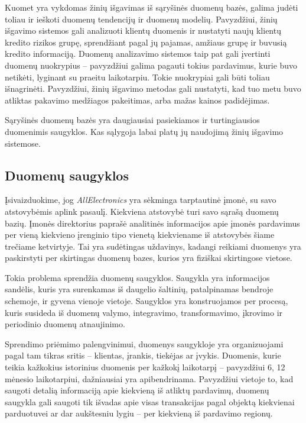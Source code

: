 Kuomet yra vykdomas žinių išgavimas iš sąryšinės duomenų bazės, galima judėti toliau ir ieškoti duomenų tendencijų ir duomenų modelių.
Pavyzdžiui, žinių išgavimo sistemos gali analizuoti klientų duomenis ir nustatyti naujų klientų kredito rizikos grupę, sprendžiant pagal jų pajamas, amžiaus grupę ir buvusią kredito informaciją.
Duomenų analizavimo sistemos taip pat gali įvertinti duomenų nuokrypius -- pavyzdžiui galima pagauti tokius pardavimus, kurie buvo netikėti, lyginant su praeitu laikotarpiu.
Tokie nuokrypiai gali būti toliau išnagrinėti.
Pavyzdžiui, žinių išgavimo metodas gali nustatyti, kad tuo metu buvo atliktas pakavimo medžiagos pakeitimas, arba mažas kainos padidėjimas.

Sąryšinės duomenų bazės yra daugiausiai pasiekiamos ir turtingiausios duomenimis saugyklos. 
Kas sąlygoja labai platų jų naudojimą žinių išgavimo sistemose.

\subsection{Duomenų saugyklos}

Įsivaizduokime, jog \textit{AllElectronics} yra sėkminga tarptautinė įmonė, su savo atstovybėmis aplink pasaulį.
Kiekviena atstovybė turi savo sąrašą duomenų bazių.
Įmonės direktorius paprašė analitinės informacijos apie įmonės pardavimus per vieną kiekvieno įrenginio tipo vienetą kiekviename iš atstovybės šiame trečiame ketvirtyje.
Tai yra sudėtingas uždavinys, kadangi reikiami duomenys yra paskirstyti per skirtingas duomenų bazes, kurios yra fiziškai skirtingose vietose.

Tokia problema sprendžia duomenų saugyklos.
Saugykla yra informacijos sandėlis, kuris yra surenkamas iš daugelio šaltinių, patalpinamas bendroje schemoje, ir gyvena vienoje vietoje.
Saugyklos yra konstruojamos per procesą, kuris susideda iš duomenų valymo, integravimo, transformavimo, įkrovimo ir periodinio duomenų atnaujinimo.

Sprendimo priėmimo palengvinimui, duomenys saugykloje yra organizuojami pagal tam tikras sritis -- klientas, įrankis, tiekėjas ar įvykis.
Duomenis, kurie teikia kažkokius istorinius duomenis per kažkokį laikotarpį -- pavyzdžiui 6, 12 mėnesio laikotarpiui, dažniausiai yra apibendrinama.
Pavyzdžiui vietoje to, kad saugoti detalią informaciją apie kiekvieną iš atliktų pardavimų, duomenų saugykla gali saugoti tik išvadas apie visas transakcijas pagal objektą kiekvienai parduotuvei ar dar aukštesniu lygiu -- per kiekvieną iš pardavimo regionų.

